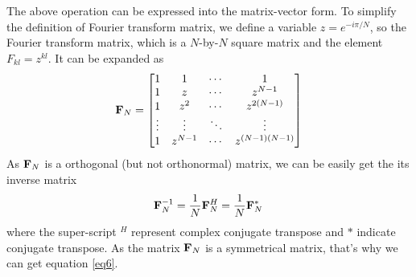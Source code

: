 \documentclass[revised,endfloat]{geophysics}
\begin{document}
The above operation can be expressed into the matrix-vector form. To simplify the definition of Fourier transform matrix, we define a variable $z = e^{-i \pi  / N}$, so the Fourier transform matrix, which is a $N$-by-$N$ square matrix and the element $F_{kl} = z^{kl}$. It can be expanded as
\begin{equation}
{\bf F}_N = \begin{bmatrix}
1 & 1 & \cdots & 1 \\
1 & z & \cdots & z^{N-1} \\
1 & z^2 & \cdots & z^{2(N-1)} \\
\vdots & \vdots & \ddots & \vdots \\
1 & z^{N-1} & \cdots & z^{(N-1)(N-1)} \\
\end{bmatrix}
\label{eq5}
\end{equation}
As ${\bf F}_N$ is a orthogonal (but not orthonormal) matrix, we can be easily get the its inverse matrix
\begin{equation}
{\bf F}_N^{-1} = \frac{1}{N} {\bf F}_N^H = \frac{1}{N} {\bf F}_N^{\ast} \,
\label{eq6}
\end{equation}
where the super-script $^H$ represent complex conjugate transpose and $\ast$ indicate conjugate transpose. As the matrix ${\bf F}_N$ is a symmetrical matrix, that's why we can get equation \ref{eq6}.
\end{document}
